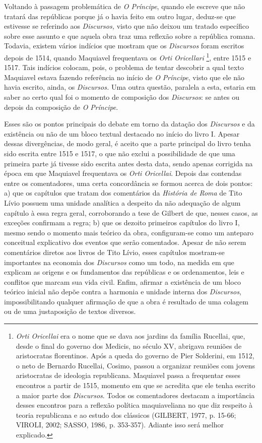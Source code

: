 Voltando à passagem problemática de \emph{O Príncipe}, quando ele
escreve que não tratará das repúblicas porque já o havia feito em outro
lugar, deduz-se que estivesse se referindo aos \emph{Discursos,} visto
que não deixou um tratado específico sobre esse assunto e que aquela
obra traz uma reflexão sobre a república romana. Todavia, existem vários
indícios que mostram que os \emph{Discursos} foram escritos depois de
1514, quando Maquiavel frequentava os \emph{Orti Oricellari} \footnote{\emph{Orti
  Oricellai} era o nome que se dava aos jardins da família Rucellai,
  que, desde o final do governo dos Medicis, no século XV, abrigava
  reuniões de aristocratas florentinos. Após a queda do governo de Pier
  Solderini, em 1512, o neto de Bernardo Rucellai, Cosimo, passou a
  organizar reuniões com jovens aristocratas de ideologia republicana.
  Maquiavel passa a frequentar esses encontros a partir de 1515, momento
  em que se acredita que ele tenha escrito a maior parte dos
  \emph{Discursos}. Todos os comentadores destacam a importância desses
  encontros para a reflexão política maquiaveliana no que diz respeito à
  teoria republicana e ao estudo dos clássicos (GILBERT, 1977, p. 15-66;
  VIROLI, 2002; SASSO, 1986, p. 353-357). Adiante isso será melhor
  explicado.}, entre 1515 e 1517. Tais indícios colocam, pois, o
problema de tentar descobrir a qual texto Maquiavel estava fazendo
referência no início de \emph{O} \emph{Príncipe}, visto que ele não
havia escrito, ainda, os \emph{Discursos.} Uma outra questão, paralela a
esta, estaria em saber ao certo qual foi o momento de composição dos
\emph{Discursos}: se antes ou depois da composição de \emph{O}
\emph{Príncipe}.

Esses são os pontos principais do debate em torno da datação dos
\emph{Discursos} e da existência ou não de um bloco textual destacado no
início do livro I. Apesar dessas divergências, de modo geral, é aceito
que a parte principal do livro tenha sido escrita entre 1515 e 1517, o
que não exclui a possibilidade de que uma primeira parte já tivesse sido
escrita antes desta data, sendo apenas corrigida na época em que
Maquiavel frequentava os \emph{Orti Oricellai}. Depois das contendas
entre os comentadores, uma certa concordância se formou acerca de dois
pontos: a) que os capítulos que tratam dos comentários da \emph{História
de Roma} de Tito Lívio possuem uma unidade analítica a despeito da não
adequação de algum capítulo à essa regra geral, corroborando a tese de
Gilbert de que, nesses casos, as exceções confirmam a regra; b) que os
dezoito primeiros capítulos do livro I, mesmo sendo o momento mais
teórico da obra, configuram-se como um anteparo conceitual explicativo
dos eventos que serão comentados. Apesar de não serem comentários
diretos aos livros de Tito Lívio, esses capítulos mostram-se importantes
na economia dos \emph{Discursos} como um todo, na medida em que explicam
as origens e os fundamentos das repúblicas e os ordenamentos, leis e
conflitos que marcam sua vida civil. Enfim, afirmar a existência de um
bloco teórico inicial não depõe contra a harmonia e unidade interna dos
\emph{Discursos}, impossibilitando qualquer afirmação de que a obra é
resultado de uma colagem ou de uma justaposição de textos diversos.

